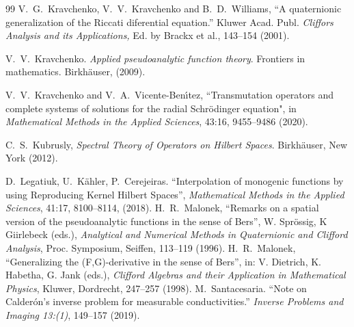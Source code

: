 \documentclass[12pt]{article}
\begin{document}
\begin{thebibliography}{99}
 V.~G.~Kravchenko, V.~V.~Kravchenko and B.~D.~Williams, ``A quaternionic generalization of the Riccati diferential equation.'' Kluwer Acad. Publ. {\em Cliffors Analysis and its Applications,} Ed. by Brackx et al., 143--154 (2001).

	
 V.~V.~Kravchenko.  {\em Applied pseudoanalytic
    function theory}.  Frontiers in mathematics. Birkh\"{a}user, (2009). %

 V.~V.~Kravchenko and V.~A.~Vicente-Ben{\'\i}tez, ``Transmutation operators and complete systems of solutions for the radial Schr{\"o}dinger equation", in \emph{Mathematical Methods in the Applied Sciences}, 43:16, 9455--9486 (2020).

 C.~S.~Kubrusly, {\em Spectral Theory of Operators on
    Hilbert Spaces}. Birkh\"{a}user, New York (2012).
 
 
D.~Legatiuk, U.~Kähler, P.~Cerejeiras. ``Interpolation of monogenic functions by using Reproducing Kernel Hilbert Spaces'', {\em Mathematical Methods in the Applied Sciences}, 41:17, 8100--8114, (2018).
H.~R.~Malonek, ``Remarks on a spatial version of the pseudoanalytic functions in the sense of Bers'', W. Sprössig, K Giirlebeck (eds.), {\em Analytical and Numerical Methods in Quaternionic and Clifford Analysis}, Proc. Symposium, Seiffen, 113--119 (1996).
H.~R.~Malonek, ``Generalizing the (F,G)-derivative in the sense of Bers'', in: V. Dietrich, K. Habetha, G. Jank (eds.), {\em Clifford Algebras and their Application in Mathematical Physics}, Kluwer, Dordrecht, 247--257 (1998).
M.~Santacesaria. ``Note on Calderón's inverse problem for measurable conductivities.'' {\em Inverse Problems and Imaging 13:(1)}, 149--157 (2019).


\end{thebibliography}
\end{document}
